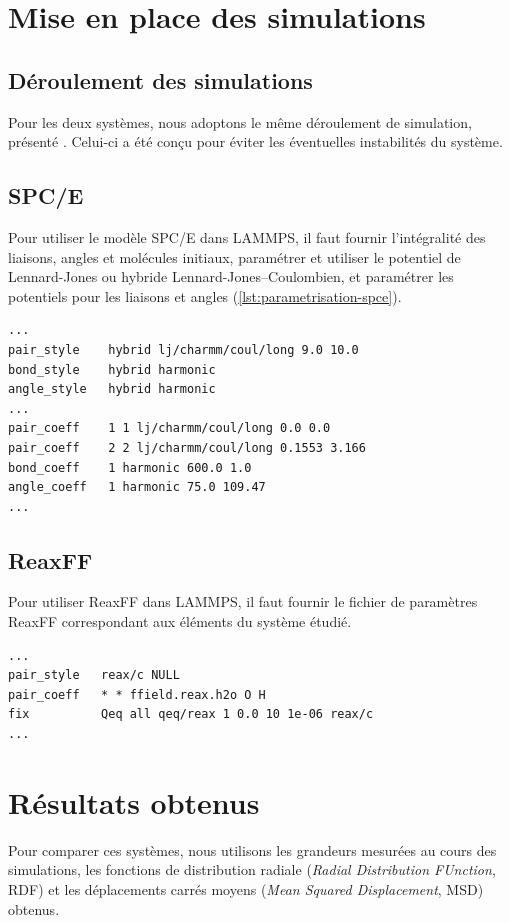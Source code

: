 \documentclass[11pt, a4paper]{article}
\begin{document}
\section{Mise en place des simulations}

	\subsection{Déroulement des simulations}

Pour les deux systèmes, nous adoptons le même déroulement de simulation, présenté . Celui-ci a été conçu pour éviter les éventuelles instabilités du système.

	\subsection{SPC/E}

Pour utiliser le modèle SPC/E dans LAMMPS, il faut fournir l'intégralité des liaisons, angles et molécules initiaux, paramétrer et utiliser le potentiel de Lennard-Jones ou hybride Lennard-Jones--Coulombien, et paramétrer les potentiels pour les liaisons et angles (\autoref{lst:parametrisation-spce}).

\begin{lstlisting}[caption={Exemple de paramétrisation pour utiliser le SPC/E}, label={lst:parametrisation-spce}]
...
pair_style    hybrid lj/charmm/coul/long 9.0 10.0
bond_style    hybrid harmonic
angle_style   hybrid harmonic
...
pair_coeff    1 1 lj/charmm/coul/long 0.0 0.0
pair_coeff    2 2 lj/charmm/coul/long 0.1553 3.166
bond_coeff    1 harmonic 600.0 1.0
angle_coeff   1 harmonic 75.0 109.47
...
\end{lstlisting}

	\subsection{ReaxFF}

Pour utiliser ReaxFF dans LAMMPS, il faut fournir le fichier de paramètres ReaxFF correspondant aux éléments du système étudié.

\begin{lstlisting}[caption={Exemple d'utilisation du ReaxFF dans LAMMPS}, label={lst:utilisation-reaxff}]
...
pair_style   reax/c NULL
pair_coeff   * * ffield.reax.h2o O H
fix          Qeq all qeq/reax 1 0.0 10 1e-06 reax/c
...
\end{lstlisting}

\section{Résultats obtenus}

Pour comparer ces systèmes, nous utilisons les grandeurs mesurées au cours des simulations, les fonctions de distribution radiale (\emph{Radial Distribution FUnction}, RDF) et les déplacements carrés moyens (\emph{Mean Squared Displacement}, MSD) obtenus.


\clearpage
\printbibliography
\end{document}
